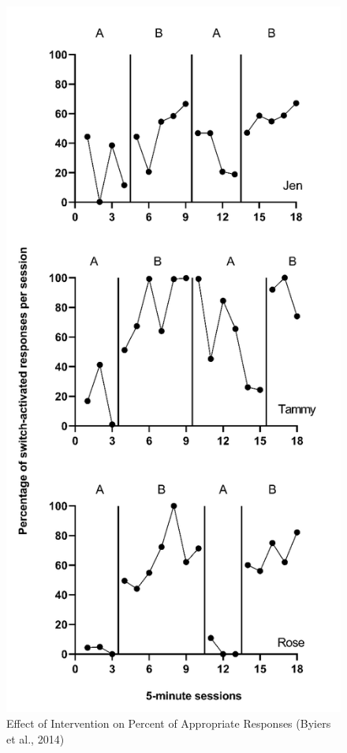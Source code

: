 \documentclass[
]{book}
\begin{document}
\begin{figure}
\includegraphics[width=0.6\linewidth]{images/Byiers2014} \caption{Effect of Intervention on Percent of Appropriate Responses (Byiers et al., 2014)}\label{fig:Byiers-2014}
\end{figure}
\end{document}
